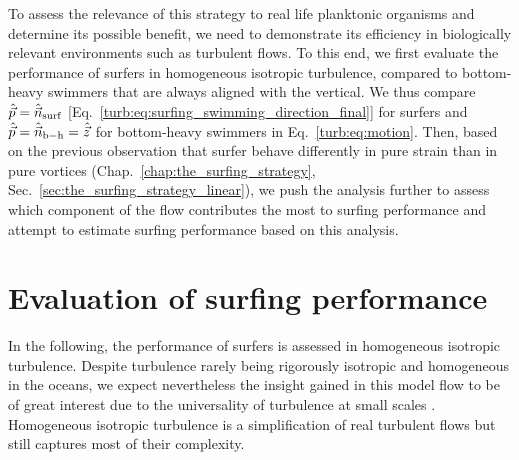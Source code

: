To assess the relevance of this strategy to real life planktonic organisms and determine its possible benefit, we need to demonstrate its efficiency in biologically relevant environments such as turbulent flows.
To this end, we first evaluate the performance of surfers in homogeneous isotropic turbulence, compared to bottom-heavy swimmers that are always aligned with the vertical.
We thus compare $\hat{\vec{p}} = \hat{\vec{n}}_{\mathrm{surf}}$ [Eq.~\eqref{turb:eq:surfing_swimming_direction_final}] for surfers and $\hat{\vec{p}}=\hat{\vec{n}}_{\mathrm{b-h}}=\hat{\vec{z}}$ for bottom-heavy swimmers in Eq.~\eqref{turb:eq:motion}.
Then, based on the previous observation that surfer behave differently in pure strain than in pure vortices (Chap.~\ref{chap:the_surfing_strategy}, Sec.~\ref{sec:the_surfing_strategy_linear}), we push the analysis further to assess which component of the flow contributes the most to surfing performance and attempt to estimate surfing performance based on this analysis.

\section{Evaluation of surfing performance}\label{sec:surfing_on_turbulence_IHT}

In the following, the performance of surfers is assessed in homogeneous isotropic turbulence.
Despite turbulence rarely being rigorously isotropic and homogeneous in the oceans, we expect nevertheless the insight gained in this model flow to be of great interest due to the universality of turbulence at small scales \citep{frisch1995turbulence}.
Homogeneous isotropic turbulence is a simplification of real turbulent flows but still captures most of their complexity.

